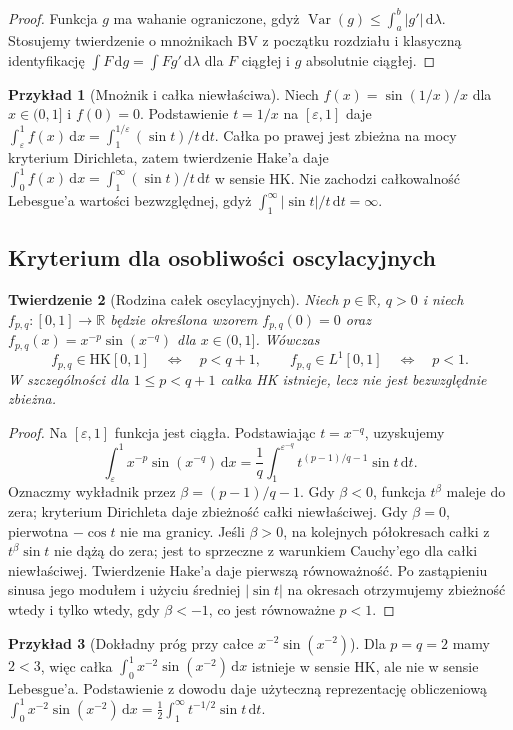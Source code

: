 \documentclass[11pt,a4paper]{article}
\numberwithin{equation}{section}
\theoremstyle{plain}
\newtheorem{twierdzenie}{Twierdzenie}[section]
\theoremstyle{definition}
\newtheorem{przyklad}[twierdzenie]{Przykład}
\theoremstyle{remark}
\newcommand{\R}{\mathbb R}
\newcommand{\Var}{\operatorname{Var}}
\newcommand{\HK}{\mathrm{HK}}
\begin{document}
\begin{proof}
Funkcja $g$ ma wahanie ograniczone, gdyż $\Var(g)\le\int_a^b|g'|\,\mathrm d\lambda$. Stosujemy twierdzenie o mnożnikach BV z początku rozdziału i klasyczną identyfikację $\int F\,\mathrm dg=\int Fg'\,\mathrm d\lambda$ dla $F$ ciągłej i $g$ absolutnie ciągłej.
\end{proof}
\begin{przyklad}[Mnożnik i całka niewłaściwa]
Niech $f(x)=\sin(1/x)/x$ dla $x\in(0,1]$ i $f(0)=0$. Podstawienie $t=1/x$ na $[\varepsilon,1]$ daje
$\int_\varepsilon^1f(x)\,\mathrm dx=\int_1^{1/\varepsilon}(\sin t)/t\,\mathrm dt$.
Całka po prawej jest zbieżna na mocy kryterium Dirichleta, zatem twierdzenie Hake'a daje
$\int_0^1f(x)\,\mathrm dx=\int_1^\infty (\sin t)/t\,\mathrm dt$ w sensie HK. Nie zachodzi całkowalność Lebesgue'a wartości bezwzględnej, gdyż $\int_1^\infty|\sin t|/t\,\mathrm dt=\infty$.
\end{przyklad}

\subsection*{Kryterium dla osobliwości oscylacyjnych}
\begin{twierdzenie}[Rodzina całek oscylacyjnych]\label{tw:hk-oscylacyjne}
Niech $p\in\R$, $q>0$ i niech $f_{p,q}:[0,1]\to\R$ będzie określona wzorem $f_{p,q}(0)=0$ oraz $f_{p,q}(x)=x^{-p}\sin(x^{-q})$ dla $x\in(0,1]$. Wówczas
\[
 f_{p,q}\in\HK[0,1]\quad\Longleftrightarrow\quad p<q+1,
 \qquad f_{p,q}\in L^1[0,1]\quad\Longleftrightarrow\quad p<1.
\]
W szczególności dla $1\le p<q+1$ całka HK istnieje, lecz nie jest bezwzględnie zbieżna.
\end{twierdzenie}
\begin{proof}
Na $[\varepsilon,1]$ funkcja jest ciągła. Podstawiając $t=x^{-q}$, uzyskujemy
\[
\int_\varepsilon^1x^{-p}\sin(x^{-q})\,\mathrm dx
=\frac1q\int_1^{\varepsilon^{-q}}t^{(p-1)/q-1}\sin t\,\mathrm dt.
\]
Oznaczmy wykładnik przez $\beta=(p-1)/q-1$. Gdy $\beta<0$, funkcja $t^\beta$ maleje do zera; kryterium Dirichleta daje zbieżność całki niewłaściwej. Gdy $\beta=0$, pierwotna $-\cos t$ nie ma granicy. Jeśli $\beta>0$, na kolejnych półokresach całki z $t^\beta\sin t$ nie dążą do zera; jest to sprzeczne z warunkiem Cauchy'ego dla całki niewłaściwej. Twierdzenie Hake'a daje pierwszą równoważność. Po zastąpieniu sinusa jego modułem i użyciu średniej $|\sin t|$ na okresach otrzymujemy zbieżność wtedy i tylko wtedy, gdy $\beta<-1$, co jest równoważne $p<1$.
\end{proof}
\begin{przyklad}[Dokładny próg przy całce $x^{-2}\sin(x^{-2})$]
Dla $p=q=2$ mamy $2<3$, więc całka $\int_0^1x^{-2}\sin(x^{-2})\,\mathrm dx$ istnieje w sensie HK, ale nie w sensie Lebesgue'a. Podstawienie z dowodu daje użyteczną reprezentację obliczeniową
$\int_0^1x^{-2}\sin(x^{-2})\,\mathrm dx=\tfrac12\int_1^\infty t^{-1/2}\sin t\,\mathrm dt$.
\end{przyklad}
\end{document}
